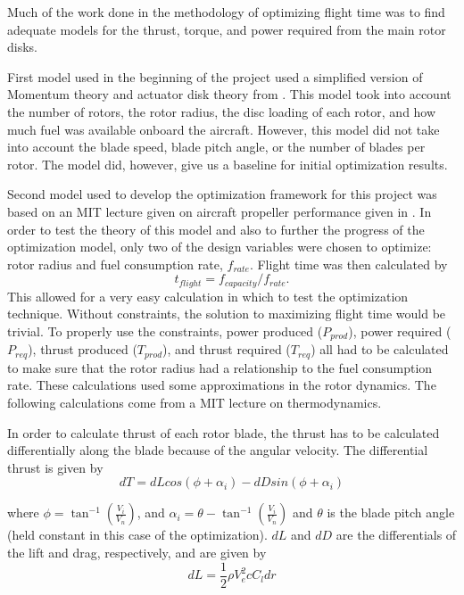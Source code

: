 \documentclass[letterpaper, 10 pt, conference]{ieeeconf}  %
\begin{document}
Much of the work done in the methodology of optimizing flight time was to find adequate models for the thrust, torque, and power required from the main rotor disks.

First model used in the beginning of the project used a simplified version of Momentum theory and actuator disk theory from \cite{helicopters2016}. This model took into account the number of rotors, the rotor radius, the disc loading of each rotor, and how much fuel was available onboard the aircraft. However, this model did not take into account the blade speed, blade pitch angle, or the number of blades per rotor. The model did, however, give us a baseline for initial optimization results.

Second model used to develop the optimization framework for this project was based on an MIT lecture given on aircraft propeller performance given in \cite{mit2016}. In order to test the theory of this model and also to further the progress of the optimization model, only two of the design variables were chosen to optimize: rotor radius and fuel consumption rate, $f_{rate}$. Flight time was then calculated by 
\begin{equation}
	t_{flight} = f_{capacity}/f_{rate}.
\end{equation}
This allowed for a very easy calculation in which to test the optimization technique. Without constraints, the solution to maximizing flight time would be trivial. To properly use the constraints, power produced ($P_{prod}$), power required ($P_{req}$), thrust produced ($T_{prod}$), and thrust required ($T_{req}$) all had to be calculated to make sure that the rotor radius had a relationship to the fuel consumption rate. These calculations used some approximations in the rotor dynamics. The following calculations come from a MIT lecture on thermodynamics.

In order to calculate thrust of each rotor blade, the thrust has to be calculated differentially along the blade because of the angular velocity. The differential thrust is given by 
\begin{equation}
	dT = dLcos(\phi + \alpha_i) - dDsin(\phi + \alpha_i)
\end{equation}

where $\phi = \tan^{-1}(\frac{V_i}{V_n})$, and $\alpha_i = \theta - \tan^{-1}(\frac{V_i}{V_n})$ and $\theta$ is the blade pitch angle (held constant in this case of the optimization). $dL$ and $dD$ are the differentials of the lift and drag, respectively, and are given by
\begin{equation}
	dL = \frac{1}{2}\rho V_e^2 c C_l dr
\end{equation}
\end{document}
